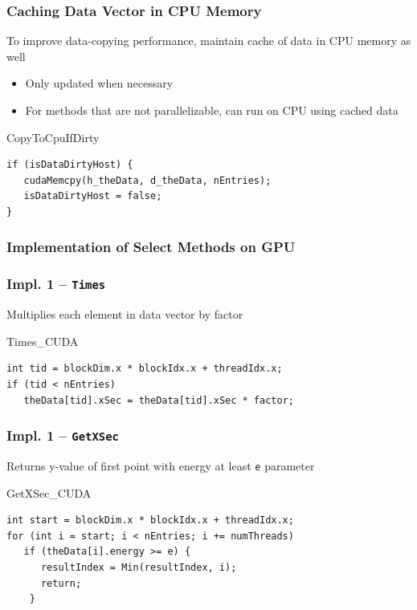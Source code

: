 \documentclass{beamer}
\begin{document}
\begin{frame}[fragile]
\frametitle{Caching Data Vector in CPU Memory}
To improve data-copying performance, maintain cache of data in CPU memory as well
\begin{itemize}
\item Only updated when necessary
\item For methods that are not parallelizable, can run on CPU using cached data
\end{itemize}
\begin{block}{CopyToCpuIfDirty}
\begin{lstlisting}
if (isDataDirtyHost) {
   cudaMemcpy(h_theData, d_theData, nEntries);
   isDataDirtyHost = false;
}
\end{lstlisting}
\end{block}

\end{frame}

\subsubsection{Implementation of Select Methods on GPU}
\begin{frame}[fragile]
\frametitle{Impl. 1 -- \texttt{Times}}
Multiplies each element in data vector by factor
\begin{block}{Times\_CUDA}
\begin{lstlisting} 
int tid = blockDim.x * blockIdx.x + threadIdx.x;
if (tid < nEntries) 
   theData[tid].xSec = theData[tid].xSec * factor;    
\end{lstlisting}
\end{block}
\end{frame}

\begin{frame}[fragile]
\frametitle{Impl. 1 -- \texttt{GetXSec}}
Returns y-value of first point with energy at least \texttt{e} parameter
\begin{block}{GetXSec\_CUDA}
\begin{lstlisting}
int start = blockDim.x * blockIdx.x + threadIdx.x;
for (int i = start; i < nEntries; i += numThreads)
   if (theData[i].energy >= e) {
      resultIndex = Min(resultIndex, i);
      return;
    }
\end{lstlisting}
\end{block}
\end{frame}
\end{document}
